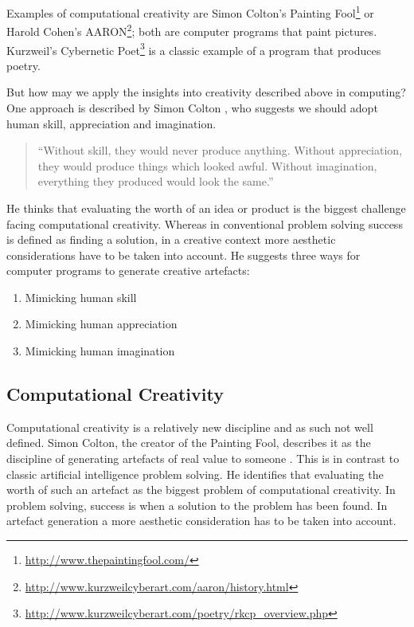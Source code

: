 Examples of computational creativity are Simon Colton's Painting Fool\footnote{\url{http://www.thepaintingfool.com/}} or Harold Cohen's AARON\footnote{\url{http://www.kurzweilcyberart.com/aaron/history.html}}; both are computer programs that paint pictures. Kurzweil's Cybernetic Poet\footnote{\url{http://www.kurzweilcyberart.com/poetry/rkcp_overview.php}} is a classic example of a program that produces poetry.

But how may we apply the insights into creativity described above in computing? One approach is described by Simon Colton \autocite{Colton2008}, who suggests we should adopt human skill, appreciation and imagination.

\begin{quotation}
  ``Without skill, they would never produce anything. Without appreciation, they would produce things which looked awful. Without imagination, everything they produced would look the same.'' 
\end{quotation}

He thinks that evaluating the worth of an idea or product is the biggest challenge facing computational creativity. Whereas in conventional problem solving success is defined as finding a solution, in a creative context more aesthetic considerations have to be taken into account. He suggests three ways for computer programs to generate creative artefacts:

\begin{enumerate}
  \item Mimicking human skill
  \item Mimicking human appreciation
  \item Mimicking human imagination
\end{enumerate}


\subsection*{Computational Creativity}

Computational creativity is a relatively new discipline and as such not well defined. Simon Colton, the creator of the Painting Fool, describes it as the discipline of generating artefacts of real value to someone \autocite{Colton2008}. This is in contrast to classic artificial intelligence problem solving. He identifies that evaluating the worth of such an artefact as the biggest problem of computational creativity. In problem solving, success is when a solution to the problem has been found. In artefact generation a more aesthetic consideration has to be taken into account.

